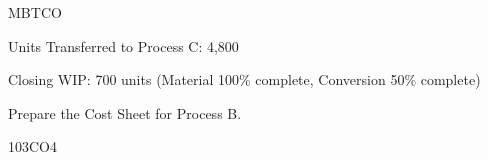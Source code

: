 \documentclass{rvcepaper}
\begin{document}
\begin{iempaperB}
\begin{cietable}{M}{BT}{CO}
{\begin{bul}
\item Units Transferred to Process C: 4,800
\item Closing WIP: 700 units (Material 100\% complete, Conversion 50\% complete)
\end{bul}
Prepare the Cost Sheet for Process B.}{10}{3}{CO4}
\end{cietable}
\stars{*****}
\end{iempaperB}
\end{document}
